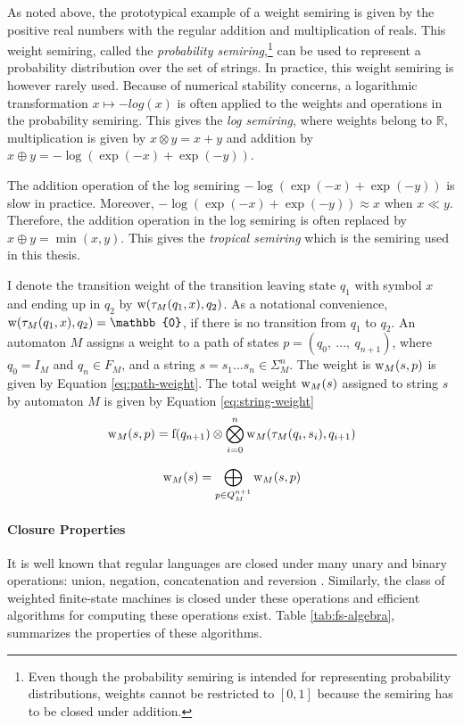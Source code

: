 As noted above, the prototypical example of a weight semiring is given by the positive real numbers with the regular addition and multiplication of reals. This weight semiring, called the {\it probability semiring},\footnote{Even though the probability semiring is intended for representing probability distributions, weights cannot be restricted to $[0,1]$ because the semiring has to be closed under addition.}  can be used to represent a probability distribution over the set of strings. In practice, this weight semiring is however rarely used. Because of numerical stability concerns, a logarithmic transformation $x \mapsto -log(x)$ is often applied to the weights and operations in the probability semiring. This gives the {\it log semiring}, where weights belong to $\mathbb{R}$, multiplication is given by $x \otimes y = x + y$ and addition by $x \oplus y = -\log(\exp(-x) + \exp(-y))$.

The addition operation of the log semiring $-\log(\exp(-x) + \exp(-y))$
is slow in practice. Moreover, $-\log(\exp(-x) + \exp(-y)) \approx x$
when $x \ll y$. Therefore, the addition operation in the log semiring
is often replaced by $x \oplus y = \min(x,y)$. This gives the {\it
  tropical semiring} which is the semiring used in this thesis.

I denote the transition weight of the transition leaving state $q_1$
with symbol $x$ and ending up in $q_2$ by $\mbox{${\rm w}$}(\tau_M(q_1,x), q_2)$. As
a notational convenience, $\w(\tau_M(q_1,x), q_2) = \mathbb{0}$, if
there is no transition from $q_1$ to $q_2$. An automaton $M$ assigns a
weight to a path of states $p = (q_0,\ ...,\ q_{n+1})$, where $q_0 =
I_M$ and $q_n \in F_M$, and a string $s = s_1...s_n \in
\Sigma_M^{n}$. The weight is $\mbox{${\rm w}$}_M(s,p)$ is given by Equation
\ref{eq:path-weight}. The total weight $\mbox{${\rm w}$}_M(s)$ assigned to string
$s$ by automaton $M$ is given by Equation \ref{eq:string-weight}
\begin{equation}
\mbox{${\rm w}$}_M(s,p) =
{\rm f}(q_{n+1})\otimes \bigotimes_{i = 0}^n \mbox{${\rm w}$}_M(\tau_M(q_i,s_i), q_{i+1})\label{eq:path-weight}
\end{equation}

\begin{equation}
\mbox{${\rm w}$}_M(s) =
\bigoplus_{p \in Q_M^{n+1}} \mbox{${\rm w}$}_M(s,p) \label{eq:string-weight}
\end{equation}

\paragraph{Closure Properties} It is well known that regular languages
are closed under many unary and binary operations: union, negation,
concatenation and reversion \citep{Sipser1996}. Similarly, the class
of weighted finite-state machines is closed under these operations and
efficient algorithms for computing these operations exist. Table
\ref{tab:fs-algebra}, summarizes the properties of these algorithms.

